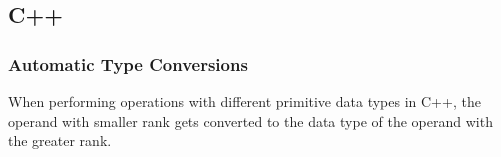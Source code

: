 \documentclass[twoside]{article}
\begin{document}
\subsection*{C++}
\vspace{2em}
\subsubsectionfont{\large\bfseries\sffamily\underline}
\subsubsection*{Automatic Type Conversions}
\vspace{1em}
\sffamily

When performing operations with different primitive data types in C++,
the operand with smaller rank gets converted to the data type of the operand
with the greater rank.
\end{document}
